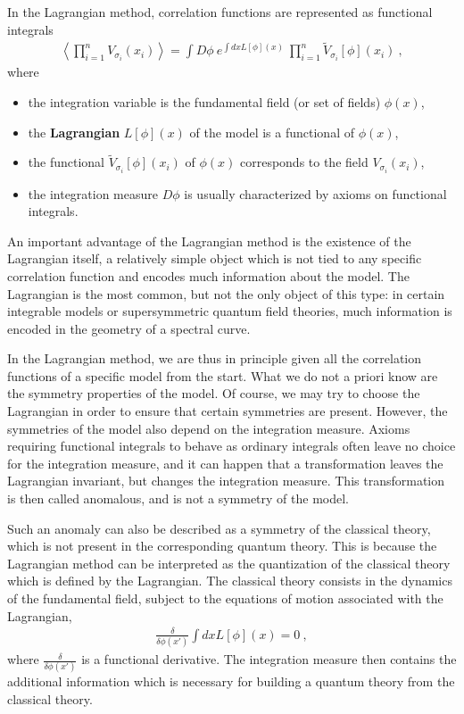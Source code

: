 \documentclass[12pt, a4paper, notitlepage, twoside]{report}
\numberwithin{equation}{section}
\theoremstyle{break}
\begin{document}
In the Lagrangian method, correlation functions are represented as functional integrals
\begin{align}
 \left\langle\prod_{i=1}^n V_{\sigma_i}(x_i)\right\rangle = \int D\phi\ e^{\int dx L[\phi](x)} \ \prod_{i=1}^n \tilde{V}_{\sigma_i}[\phi](x_i)\ ,
\end{align}
where  
\begin{itemize}
 \item the integration variable is the fundamental field (or set of fields) $\phi(x)$,
\item the \textbf{\boldmath Lagrangian} $L[\phi](x)$ of the model is a functional of $\phi(x)$,
\item the functional $\tilde{V}_{\sigma_i}[\phi](x_i)$ of $\phi(x)$ corresponds to the field $ V_{\sigma_i}(x_i)$,
\item the integration measure $D\phi$ is usually characterized by axioms on functional integrals. 
\end{itemize}
An important advantage of the Lagrangian method is the existence of the Lagrangian itself, a relatively simple object which is not tied to any specific correlation function and encodes much information about the model.
The Lagrangian is the most common, but not the only object of this type: in certain integrable models or supersymmetric quantum field theories, much information is encoded in the geometry of a spectral curve.

In the Lagrangian method, we are thus in principle given all the correlation functions of a specific model from the start.
What we do not a priori know are the symmetry properties of the model.
Of course, we may try to choose the Lagrangian in order to ensure that certain symmetries are present.
However, the symmetries of the model also depend on the integration measure.
Axioms requiring functional integrals to behave as ordinary integrals often leave no choice for the integration measure, and 
it can happen that a transformation leaves the Lagrangian invariant, but changes the integration measure.
This transformation is then called anomalous, and is not a symmetry of the model.

Such an anomaly can also be described as a symmetry of the classical theory, which is not present in the corresponding quantum theory.
This is because the Lagrangian method can be interpreted as the quantization of the classical theory which is defined by the Lagrangian.
The classical theory consists in the dynamics of the fundamental field, subject to the equations of motion associated with the Lagrangian, 
\begin{align}
 \frac{\delta }{\delta \phi(x')} \int dx L[\phi](x) = 0 \ ,
\end{align}
 where $\frac{\delta}{\delta\phi(x') } $ is a functional derivative.
The integration measure then contains the additional information which is necessary for building a quantum theory from the classical theory. 
\end{document}
